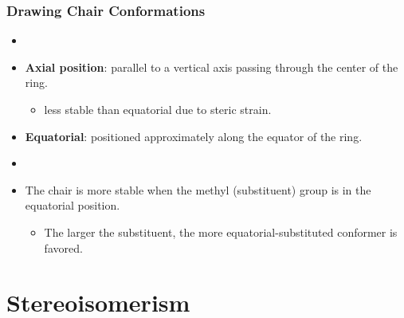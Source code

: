 \documentclass[12pt,a4paper]{article}
\begin{document}
\begin{itemize}
    \subsubsection{Drawing Chair Conformations}
    \begin{itemize}
        \item {}
        \item \textbf{Axial position}: parallel to a vertical axis passing through the center of the ring.
            \begin{itemize}
                \item less stable than equatorial due to steric strain.
            \end{itemize}
        \item \textbf{Equatorial}: positioned approximately along the equator of the ring.
                \item {}
        \item The chair is more stable when the methyl (substituent) group is in the {\color{o-Sun}equatorial} position.
            \begin{itemize}
                \item The larger the substituent, the more equatorial-substituted conformer is favored.
            \end{itemize}
    \end{itemize}
\end{itemize}

\clearpage
\section{Stereoisomerism}
\end{document}
